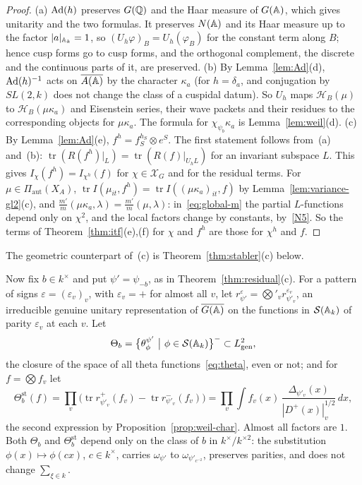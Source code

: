 \begin{proof}
(a) $\operatorname{Ad}(h)$ preserves $G(\mathbb{Q})$ and the Haar measure of $G(\mathbb{A})$, which
gives unitarity and the two formulas. It preserves $N(\mathbb{A})$ and its Haar
measure up to the factor $|a|_{\mathbb{A}_k}=1$, so $(U_h\varphi)_B=U_h(\varphi_B)$
for the constant term along $B$; hence cusp forms go to cusp forms, and
the orthogonal complement, the discrete and the continuous parts of it,
are preserved. (b) By Lemma~\ref{lem:Ad}(d), $\operatorname{Ad}(h)^{-1}$ acts
on $\overline{A(\mathbb{A})}$ by the character $\kappa_a$ (for $h=\delta_a$, and
conjugation by $SL(2,k)$ does not change the class of a cuspidal datum).
So $U_h$ maps $\mathcal H_B(\mu)$ to $\mathcal H_B(\mu\kappa_a)$ and
Eisenstein series, their wave packets and their residues to the
corresponding objects for $\mu\kappa_a$. The formula for
$\chi_{\psi_b}\kappa_a$ is Lemma~\ref{lem:weil}(d). (c) By
Lemma~\ref{lem:Ad}(e), $f^h=f_S^{h_S}\otimes e^S$. The first statement
follows from~(a) and~(b): $\operatorname{tr}(R(f^h)|_{L})=
\operatorname{tr}(R(f)|_{U_hL})$ for an invariant subspace $L$. This gives
$I_\chi(f^h)=I_{\chi^h}(f)$ for $\chi\in\mathcal X_G$ and for the residual
terms. For $\mu\in\Pi_{\mathrm{aut}}(X_A)$, $\operatorname{tr}I(\mu_{it},
f^h)=\operatorname{tr}I((\mu\kappa_a)_{it},f)$ by
Lemma~\ref{lem:variance-gl2}(c), and $\frac{m'}m(\mu\kappa_a,\lambda)=
\frac{m'}m(\mu,\lambda)$: in~\eqref{eq:global-m} the partial $L$-functions
depend only on $\chi^2$, and the local factors change by constants,
by~\ref{N5}. So the terms of Theorem~\ref{thm:itf}(e),(f) for $\chi$ and
$f^h$ are those for $\chi^h$ and $f$.
\end{proof}

The geometric counterpart of~(c) is Theorem~\ref{thm:stabler}(c) below.

Now fix $b\in k^\times$ and put $\psi'=\psi_{-b}$, as in
Theorem~\ref{thm:residual}(c). For a pattern of signs
$\varepsilon=(\varepsilon_v)_v$, with $\varepsilon_v=+$ for almost all
$v$, let $r^\varepsilon_{\psi'}=\bigotimes'_vr^{\varepsilon_v}_{\psi'_v}$, an
irreducible genuine unitary representation of $\overline{G(\mathbb{A})}$ on the functions in
$\mathcal S(\mathbb{A}_k)$ of parity $\varepsilon_v$ at each $v$. Let
\[
\Theta_b=\bigl\{\theta^{\psi'}_\phi\ \big|\ \phi\in\mathcal S(\A_k)\bigr\}^{-}
\subset L^2_{\mathrm{gen}},
\]
the closure of the space of all theta functions~\eqref{eq:theta}, even or
not; and for $f=\bigotimes f_v$ let
\[
\Theta^{\mathrm{st}}_b(f)=\prod_v\bigl(\operatorname{tr}r^+_{\psi'_v}(f_v)-
\operatorname{tr}r^-_{\psi'_v}(f_v)\bigr)=\prod_v\int f_v(x)\,
\frac{\Delta_{\psi'_v}(x)}{|D^+(x)|_v^{1/2}}\,dx,
\]
the second expression by Proposition~\ref{prop:weil-char}. Almost all
factors are $1$. Both $\Theta_b$ and $\Theta^{\mathrm{st}}_b$ depend only
on the class of $b$ in $k^\times/k^{\times2}$: the substitution
$\phi(x)\mapsto\phi(cx)$, $c\in k^\times$, carries $\omega_{\psi'}$ to
$\omega_{\psi'_{c^{-2}}}$, preserves parities, and does not change
$\sum_{\xi\in k}$.

